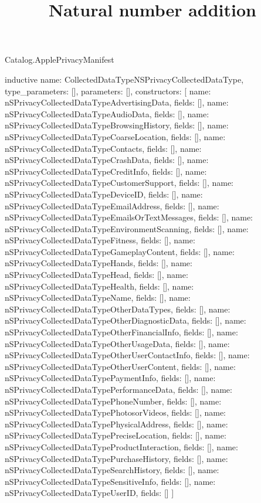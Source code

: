 \begin{lexlean}{Catalog.ApplePrivacyManifest}
\title{Natural number addition}
\begin{semanticmodule}
inductive{
  name: CollectedDataTypeNSPrivacyCollectedDataType,
  type_parameters: [],
  parameters: [],
  constructors: [
    {name: nSPrivacyCollectedDataTypeAdvertisingData, fields: []},
    {name: nSPrivacyCollectedDataTypeAudioData, fields: []},
    {name: nSPrivacyCollectedDataTypeBrowsingHistory, fields: []},
    {name: nSPrivacyCollectedDataTypeCoarseLocation, fields: []},
    {name: nSPrivacyCollectedDataTypeContacts, fields: []},
    {name: nSPrivacyCollectedDataTypeCrashData, fields: []},
    {name: nSPrivacyCollectedDataTypeCreditInfo, fields: []},
    {name: nSPrivacyCollectedDataTypeCustomerSupport, fields: []},
    {name: nSPrivacyCollectedDataTypeDeviceID, fields: []},
    {name: nSPrivacyCollectedDataTypeEmailAddress, fields: []},
    {name: nSPrivacyCollectedDataTypeEmailsOrTextMessages, fields: []},
    {name: nSPrivacyCollectedDataTypeEnvironmentScanning, fields: []},
    {name: nSPrivacyCollectedDataTypeFitness, fields: []},
    {name: nSPrivacyCollectedDataTypeGameplayContent, fields: []},
    {name: nSPrivacyCollectedDataTypeHands, fields: []},
    {name: nSPrivacyCollectedDataTypeHead, fields: []},
    {name: nSPrivacyCollectedDataTypeHealth, fields: []},
    {name: nSPrivacyCollectedDataTypeName, fields: []},
    {name: nSPrivacyCollectedDataTypeOtherDataTypes, fields: []},
    {name: nSPrivacyCollectedDataTypeOtherDiagnosticData, fields: []},
    {name: nSPrivacyCollectedDataTypeOtherFinancialInfo, fields: []},
    {name: nSPrivacyCollectedDataTypeOtherUsageData, fields: []},
    {name: nSPrivacyCollectedDataTypeOtherUserContactInfo, fields: []},
    {name: nSPrivacyCollectedDataTypeOtherUserContent, fields: []},
    {name: nSPrivacyCollectedDataTypePaymentInfo, fields: []},
    {name: nSPrivacyCollectedDataTypePerformanceData, fields: []},
    {name: nSPrivacyCollectedDataTypePhoneNumber, fields: []},
    {name: nSPrivacyCollectedDataTypePhotosorVideos, fields: []},
    {name: nSPrivacyCollectedDataTypePhysicalAddress, fields: []},
    {name: nSPrivacyCollectedDataTypePreciseLocation, fields: []},
    {name: nSPrivacyCollectedDataTypeProductInteraction, fields: []},
    {name: nSPrivacyCollectedDataTypePurchaseHistory, fields: []},
    {name: nSPrivacyCollectedDataTypeSearchHistory, fields: []},
    {name: nSPrivacyCollectedDataTypeSensitiveInfo, fields: []},
    {name: nSPrivacyCollectedDataTypeUserID, fields: []}
  ]
}


\end{semanticmodule}
\end{lexlean}
